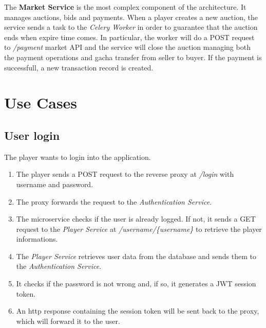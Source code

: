 \documentclass{article}
\begin{document}
The \textbf{Market Service} is the most complex component of the architecture. It manages auctions, bids and payments. When a player creates a new auction, the service sends a task to the \emph{Celery Worker} in order to guarantee that the auction ends when expire time comes. In particular, the worker will do a POST request to \emph{/payment} market API and the service will close the auction managing both the payment operations and gacha transfer from seller to buyer. If the payment is successfull, a new transaction record is created.

\section{Use Cases}
\subsection{User login}
The player wants to login into the application.
\begin{enumerate}
    \item The player sends a POST request to the reverse proxy at \emph{/login} with username and password.
    \item The proxy forwards the request to the \emph{Authentication Service}.
    \item The microservice checks if the user is already logged. If not, it sends a GET request to the \emph{Player Service} at \emph{/username/\{username\}} to retrieve the player informations.
    \item The \emph{Player Service} retrieves user data from the database and sends them to the \emph{Authentication Service}.
    \item It checks if the password is not wrong and, if so, it generates a JWT session token.
    \item An http response containing the session token will be sent back to the proxy, which will forward it to the user.
\end{enumerate}
\end{document}
